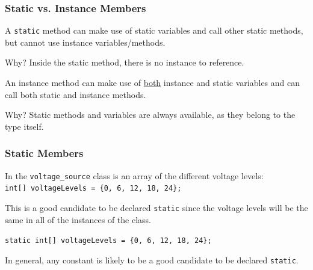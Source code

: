 \begin{frame}
\frametitle{Static vs. Instance Members}

A \texttt{static} method can make use of static variables and call other static methods, but cannot use instance variables/methods.

Why? Inside the static method, there is no instance to reference.

An instance method can make use of \underline{both} instance and static variables and can call both static and instance methods.

Why? Static methods and variables are always available, as they belong to the type itself.

\end{frame}

\begin{frame}
\frametitle{Static Members}

In the \texttt{voltage\_source} class is an array of the different voltage levels:\\
\quad \texttt{int[] voltageLevels = \{0, 6, 12, 18, 24\};}

This is a good candidate to be declared \texttt{static} since the voltage levels will be the same in all of the instances of the class.

\texttt{static int[] voltageLevels = \{0, 6, 12, 18, 24\};}

In general, any constant is likely to be a good candidate to be declared \texttt{static}.

\end{frame}




